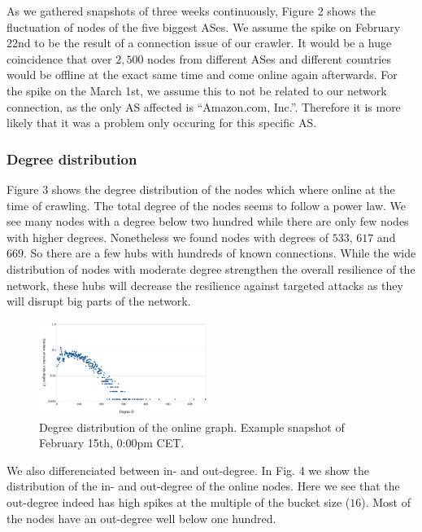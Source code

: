 \documentclass[10pt,conference,final]{IEEEtran}
\begin{document}
As we gathered snapshots of three weeks continuously, Figure 2 shows the fluctuation of nodes of the five biggest ASes.
We assume the spike on February 22nd to be the result of a connection issue of our crawler.
It would be a huge coincidence that over $2,500$ nodes from different ASes and different countries would be offline at the exact same time and come online again afterwards.
For the spike on the March 1st, we assume this to not be related to our network connection, as the only AS affected is ``Amazon.com, Inc.''.
Therefore it is more likely that it was a problem only occuring for this specific AS.

\vspace{1mm}

\subsubsection{Degree distribution}
\label{sec:RDegree}
Figure 3 shows the degree distribution of the nodes which where online at the time of crawling.
The total degree of the nodes seems to follow a power law.
We see many nodes with a degree below two hundred while there are only few nodes with higher degrees.
Nonetheless we found nodes with degrees of $533$, $617$ and $669$.
So there are a few hubs with hundreds of known connections.
While the wide distribution of nodes with moderate degree strengthen the overall resilience of the network, these hubs will decrease the resilience against targeted attacks as they will disrupt big parts of the network.

\begin{figure}[!t]
\label{fig:3}
\centering
\includegraphics[width=0.49\textwidth]{./Pictures/degreeDistribution.png}
\caption{Degree distribution of the online graph. Example snapshot of February 15th, 0:00pm CET.}
\end{figure}

We also differenciated between in- and out-degree.
In Fig. 4 we show the distribution of the in- and out-degree of the online nodes.
Here we see that the out-degree indeed has high spikes at the multiple of the bucket size ($16$).
Most of the nodes have an out-degree well below one hundred.
\end{document}
